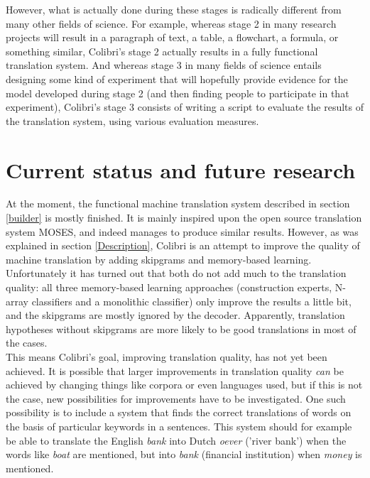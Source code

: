 \documentclass[12pt]{article}
\begin{document}
However, what is actually done during these stages is radically different from many other fields of science. For example, whereas stage 2 in many research projects will result in a paragraph of text, a table, a flowchart, a formula, or something similar, Colibri's stage 2 actually results in a fully functional translation system. And whereas stage 3 in many fields of science entails designing some kind of experiment that will hopefully provide evidence for the model developed during stage 2 (and then finding people to participate in that experiment), Colibri's stage 3 consists of writing a script to evaluate the results of the translation system, using various evaluation measures.




\section{Current status and future research}

At the moment, the functional machine translation system described in section \ref{builder} is mostly finished. It is mainly inspired upon the open source translation system MOSES, and indeed manages to produce similar results. However, as was explained in section \ref{Description}, Colibri is an attempt to improve the quality of machine translation by adding skipgrams and memory-based learning. Unfortunately it has turned out that both do not add much to the translation quality: all three memory-based learning approaches (construction experts, N-array classifiers and a monolithic classifier) only improve the results a little bit, and the skipgrams are mostly ignored by the decoder. Apparently, translation hypotheses without skipgrams are more likely to be good translations in most of the cases. \\\indent
This means Colibri's goal, improving translation quality, has not yet been achieved. It is possible that larger improvements in translation quality \emph{can} be achieved by changing things like corpora or even languages used, but if this is not the case, new possibilities for improvements have to be investigated. One such possibility is to include a system that finds the correct translations of words on the basis of particular keywords in a sentences. This system should for example be able to translate the English \emph{bank} into Dutch \emph{oever} ('river bank') when the words like \emph{boat} are mentioned, but into \emph{bank} (financial institution) when \emph{money} is mentioned.
\end{document}
